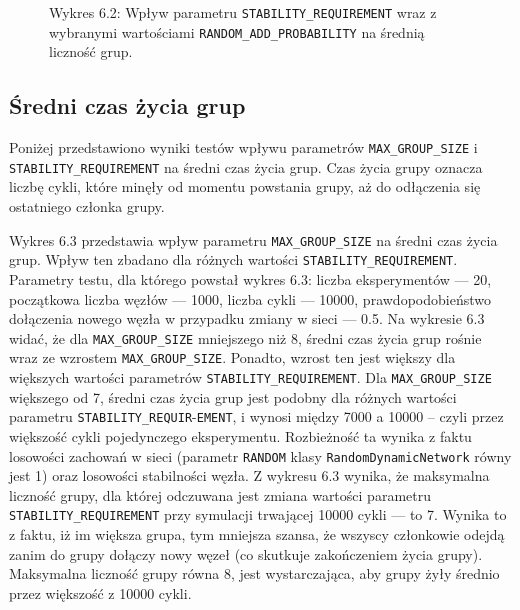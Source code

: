 \documentclass[12pt, twoside, openany]{report}
\begin{document}
\begin{figure}[H]
\captionsetup{labelformat=empty}
\caption{Wykres 6.2: Wpływ parametru \texttt{STABILITY\_REQUIREMENT} wraz z wybranymi wartościami \texttt{RANDOM\_ADD\_PROBABILITY} na średnią liczność grup.}
\end{figure}

\subsection{Średni czas życia grup}

Poniżej przedstawiono wyniki testów wpływu parametrów \texttt{MAX\_GROUP\_SIZE} i \texttt{STABILITY\_REQUIREMENT} na średni czas życia grup. Czas życia grupy oznacza liczbę cykli, które minęły od momentu powstania grupy, aż do odłączenia się ostatniego członka grupy.

Wykres 6.3 przedstawia wpływ parametru \texttt{MAX\_GROUP\_SIZE} na średni czas życia grup. Wpływ ten zbadano dla różnych wartości \texttt{STABILITY\_REQUIREMENT}. Parametry testu, dla którego powstał wykres 6.3: liczba eksperymentów --- 20, początkowa liczba węzłów --- 1000, liczba cykli --- 10000, prawdopodobieństwo dołączenia nowego węzła w przypadku zmiany w sieci --- 0.5. Na wykresie 6.3 widać, że dla \texttt{MAX\_GROUP\_SIZE} mniejszego niż 8, średni czas życia grup rośnie wraz ze wzrostem \texttt{MAX\_GROUP\_SIZE}. Ponadto, wzrost ten jest większy dla większych wartości parametrów \texttt{STABILITY\_REQUIREMENT}. Dla \texttt{MAX\_GROUP\_SIZE} większego od 7, średni czas życia grup jest podobny dla różnych wartości parametru \texttt{STABILITY\_REQUIR}-\texttt{EMENT}, i wynosi między 7000 a 10000 -- czyli przez większość cykli pojedynczego eksperymentu. Rozbieżność ta wynika z faktu losowości zachowań w sieci (parametr \texttt{RANDOM} klasy \texttt{RandomDynamicNetwork} równy jest 1) oraz losowości stabilności węzła. Z wykresu 6.3 wynika, że maksymalna liczność grupy, dla której odczuwana jest zmiana wartości parametru  \texttt{STABILITY\_REQUIREMENT} przy symulacji trwającej 10000 cykli --- to 7. Wynika to z faktu, iż im większa grupa, tym mniejsza szansa, że wszyscy członkowie odejdą zanim do grupy dołączy nowy węzeł (co skutkuje zakończeniem życia grupy). Maksymalna liczność grupy równa 8, jest wystarczająca, aby grupy żyły średnio przez większość z 10000 cykli.
\end{document}
